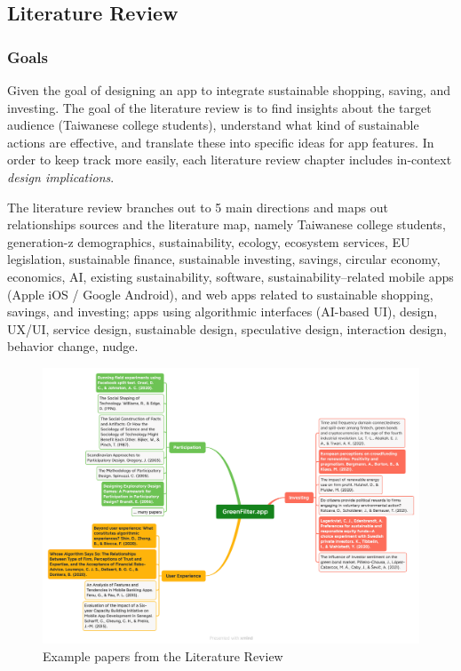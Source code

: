 \documentclass[
  letterpaper,
  DIV=11,
  numbers=noendperiod]{scrartcl}
\begin{document}
\newpage

\subsection{Literature Review}\label{literature-review}

\subsubsection{Goals}\label{goals}

Given the goal of designing an app to integrate sustainable shopping,
saving, and investing. The goal of the literature review is to find
insights about the target audience (Taiwanese college students),
understand what kind of sustainable actions are effective, and translate
these into specific ideas for app features. In order to keep track more
easily, each literature review chapter includes in-context \emph{design
implications}.

The literature review branches out to 5 main directions and maps out
relationships sources and the literature map, namely Taiwanese college
students, generation-z demographics, sustainability, ecology, ecosystem
services, EU legislation, sustainable finance, sustainable investing,
savings, circular economy, economics, AI, existing sustainability,
software, sustainability--related mobile apps (Apple iOS / Google
Android), and web apps related to sustainable shopping, savings, and
investing; apps using algorithmic interfaces (AI-based UI), design,
UX/UI, service design, sustainable design, speculative design,
interaction design, behavior change, nudge.

\begin{figure}[H]

{\centering \includegraphics[width=1\textwidth,height=\textheight]{./images/literature/literature.png}

}

\caption{Example papers from the Literature Review}

\end{figure}%
\end{document}
